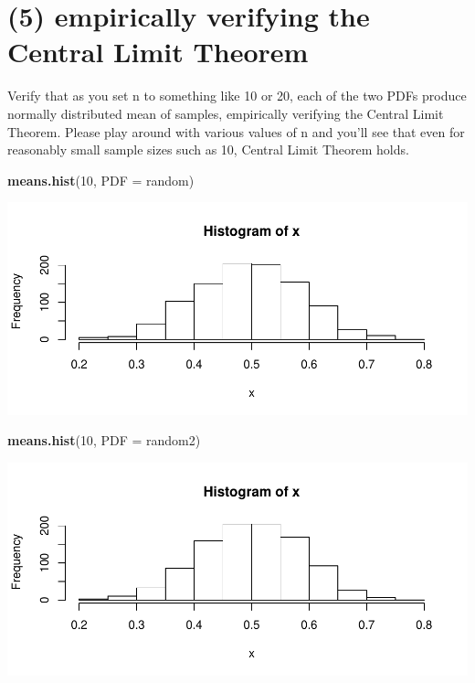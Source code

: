 \documentclass[]{article}
\newenvironment{Shaded}{\begin{snugshade}}{\end{snugshade}}
\newcommand{\KeywordTok}[1]{\textcolor[rgb]{0.13,0.29,0.53}{\textbf{{#1}}}}
\newcommand{\DataTypeTok}[1]{\textcolor[rgb]{0.13,0.29,0.53}{{#1}}}
\newcommand{\DecValTok}[1]{\textcolor[rgb]{0.00,0.00,0.81}{{#1}}}
\newcommand{\NormalTok}[1]{{#1}}
\begin{document}
\section{(5) empirically verifying the Central Limit
Theorem}\label{empirically-verifying-the-central-limit-theorem}

Verify that as you set n to something like 10 or 20, each of the two
PDFs produce normally distributed mean of samples, empirically verifying
the Central Limit Theorem. Please play around with various values of n
and you'll see that even for reasonably small sample sizes such as 10,
Central Limit Theorem holds.

\begin{Shaded}
\begin{Highlighting}[]
\KeywordTok{means.hist}\NormalTok{(}\DecValTok{10}\NormalTok{, }\DataTypeTok{PDF =} \NormalTok{random)}
\end{Highlighting}
\end{Shaded}

\includegraphics{CHunt_Assign9_PS1_PS2_files/figure-latex/unnamed-chunk-8-1.pdf}

\begin{Shaded}
\begin{Highlighting}[]
\KeywordTok{means.hist}\NormalTok{(}\DecValTok{10}\NormalTok{, }\DataTypeTok{PDF =} \NormalTok{random2)}
\end{Highlighting}
\end{Shaded}

\includegraphics{CHunt_Assign9_PS1_PS2_files/figure-latex/unnamed-chunk-8-2.pdf}
\end{document}
